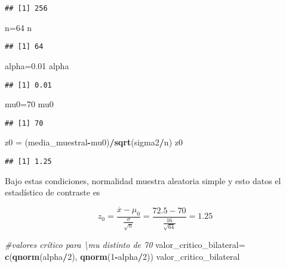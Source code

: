 \documentclass[
]{article}
\newenvironment{Shaded}{\begin{snugshade}}{\end{snugshade}}
\newcommand{\CommentTok}[1]{\textcolor[rgb]{0.56,0.35,0.01}{\textit{#1}}}
\newcommand{\DecValTok}[1]{\textcolor[rgb]{0.00,0.00,0.81}{#1}}
\newcommand{\FloatTok}[1]{\textcolor[rgb]{0.00,0.00,0.81}{#1}}
\newcommand{\KeywordTok}[1]{\textcolor[rgb]{0.13,0.29,0.53}{\textbf{#1}}}
\newcommand{\NormalTok}[1]{#1}
\newcommand{\OperatorTok}[1]{\textcolor[rgb]{0.81,0.36,0.00}{\textbf{#1}}}
\newcommand{\StringTok}[1]{\textcolor[rgb]{0.31,0.60,0.02}{#1}}
\begin{document}
\begin{verbatim}
## [1] 256
\end{verbatim}

\begin{Shaded}
\begin{Highlighting}[]
\NormalTok{n=}\DecValTok{64}
\NormalTok{n}
\end{Highlighting}
\end{Shaded}

\begin{verbatim}
## [1] 64
\end{verbatim}

\begin{Shaded}
\begin{Highlighting}[]
\NormalTok{alpha=}\FloatTok{0.01}
\NormalTok{alpha}
\end{Highlighting}
\end{Shaded}

\begin{verbatim}
## [1] 0.01
\end{verbatim}

\begin{Shaded}
\begin{Highlighting}[]
\NormalTok{mu0=}\DecValTok{70}
\NormalTok{mu0}
\end{Highlighting}
\end{Shaded}

\begin{verbatim}
## [1] 70
\end{verbatim}

\begin{Shaded}
\begin{Highlighting}[]
\NormalTok{z0 =}\StringTok{ }\NormalTok{(media_muestral}\OperatorTok{-}\NormalTok{mu0)}\OperatorTok{/}\KeywordTok{sqrt}\NormalTok{(sigma2}\OperatorTok{/}\NormalTok{n)}
\NormalTok{z0}
\end{Highlighting}
\end{Shaded}

\begin{verbatim}
## [1] 1.25
\end{verbatim}

Bajo estas condiciones, normalidad muestra aleatoria simple y esto datos
el estadístico de contraste es

\[z_0=\frac{\overline{x}-\mu_0}{\frac{\sigma}{\sqrt{n}}}=
\frac{72.5-70}{\frac{16}{\sqrt{64}}}
=1.25\]

\begin{Shaded}
\begin{Highlighting}[]
\CommentTok{#valores crítico para \textbackslash{}mu  distinto de 70}
\NormalTok{valor_critico_bilateral=}\StringTok{ }\KeywordTok{c}\NormalTok{(}\KeywordTok{qnorm}\NormalTok{(alpha}\OperatorTok{/}\DecValTok{2}\NormalTok{), }\KeywordTok{qnorm}\NormalTok{(}\DecValTok{1}\OperatorTok{-}\NormalTok{alpha}\OperatorTok{/}\DecValTok{2}\NormalTok{))}
\NormalTok{valor_critico_bilateral}
\end{Highlighting}
\end{Shaded}
\end{document}
